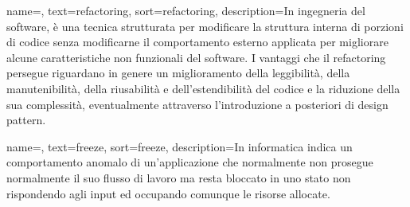 
\renewcommand{\acronymname}{Acronimi e abbreviazioni}








   
\renewcommand{\glossaryname}{Glossario}

{
    name=,
    text=refactoring,
    sort=refactoring,
    description={In ingegneria del software, è una tecnica strutturata per modificare la struttura interna di porzioni di codice senza modificarne il comportamento esterno applicata per migliorare alcune caratteristiche non funzionali del software. I vantaggi che il refactoring persegue riguardano in genere un miglioramento della leggibilità, della manutenibilità, della riusabilità e dell'estendibilità del codice e la riduzione della sua complessità, eventualmente attraverso l'introduzione a posteriori di design pattern.}
}

{
    name=,
    text=freeze,
    sort=freeze,
    description={In informatica indica un comportamento anomalo di un'applicazione che normalmente non prosegue normalmente il suo flusso di lavoro ma resta bloccato in uno stato non rispondendo agli input ed occupando comunque le risorse allocate.}
}

